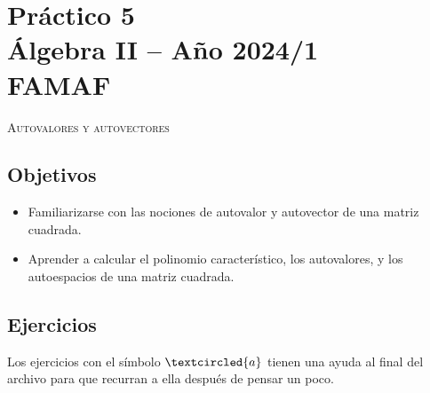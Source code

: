 \section*{Práctico 5 \\ Álgebra  II -- Año 2024/1 \\ FAMAF}


    
    \centerline{\textsc{Autovalores y autovectores}}
    
    
\subsection*{Objetivos}
    
\begin{itemize}
\item Familiarizarse con las nociones de autovalor y autovector de una matriz cuadrada.

\item Aprender a calcular el polinomio característico, los autovalores, y los autoespacios de una matriz cuadrada.
\end{itemize}
    
    
\subsection*{Ejercicios} Los ejercicios con el símbolo $\textcircled{a}$ tienen una ayuda al final del archivo para que recurran a ella después de pensar un poco.


